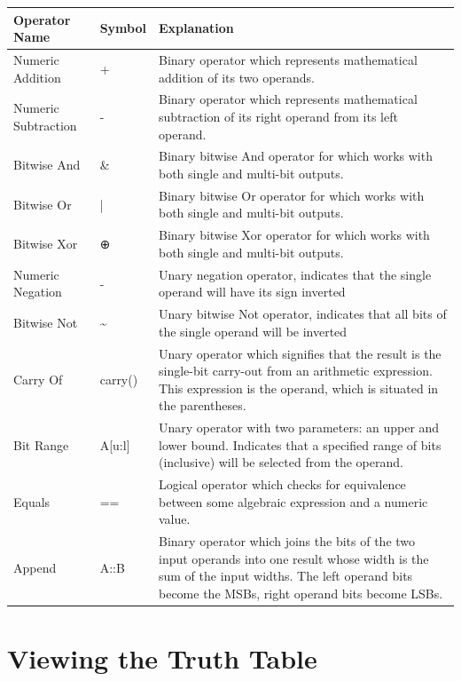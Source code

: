 \begin{table}[!ht]
    \centering
    \begin{tabular}{|l|l|l|}
    \hline
        Operator Name & Symbol & Explanation \\ \hline
        Numeric Addition & + & Binary operator which represents mathematical addition of its two operands. \\ \hline
        Numeric Subtraction & - & Binary operator which represents mathematical subtraction of its right operand from its left operand. \\ \hline
        Bitwise And & \& & Binary bitwise And operator for which works with both single and multi-bit outputs. \\ \hline
        Bitwise Or & | & Binary bitwise Or operator for which works with both single and multi-bit outputs. \\ \hline
        Bitwise Xor & ⊕ & Binary bitwise Xor operator for which works with both single and multi-bit outputs. \\ \hline
        Numeric Negation & - & Unary negation operator, indicates that the single operand will have its sign inverted \\ \hline
        Bitwise Not & \~ & Unary bitwise Not operator, indicates that all bits of the single operand will be inverted \\ \hline
        Carry Of & carry() & Unary operator which signifies that the result is the single-bit carry-out from an arithmetic expression. This expression is the operand, which is situated in the parentheses. \\ \hline
        Bit Range & A[u:l] & Unary operator with two parameters: an upper and lower bound. Indicates that a specified range of bits (inclusive) will be selected from the operand. \\ \hline
        Equals & == & Logical operator which checks for equivalence between some algebraic expression and a numeric value. \\ \hline
        Append & A::B & Binary operator which joins the bits of the two input operands into one result whose width is the sum of the input widths. The left operand bits become the MSBs, right operand bits become LSBs. \\ \hline
    \end{tabular}
\end{table}

\section{Viewing the Truth Table} \label{sec:ttView}
